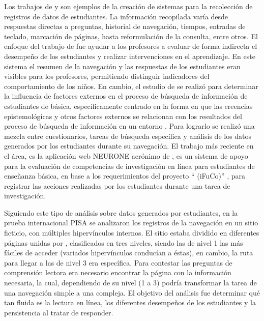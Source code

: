 Los trabajos de \textcite{hwang2008novel} y \textcite{tu2008eighth} son ejemplos de la creación de sistemas para la recolección de registros de datos de estudiantes. La información recopilada varía desde respuestas directas a preguntas, historial de navegación, tiempos, entradas de teclado, marcación de páginas, hasta reformulación de la consulta, entre otros. El enfoque del trabajo de \textcite{hwang2008novel} fue ayudar a los profesores a evaluar de forma indirecta el desempeño de los estudiantes y realizar intervenciones en el aprendizaje. En este sistema el resumen de la navegación y las respuestas de los estudiantes eran visibles para los profesores, permitiendo distinguir indicadores del comportamiento  de los niños. En cambio, el estudio de \textcite{tu2008eighth} se realizó para determinar la influencia de factores externos en el proceso de búsqueda de información de estudiantes de básica, específicamente centrado en la forma en que las creencias epistemológicas y otros factores externos se relacionan con los resultados del proceso de búsqueda de información en un entorno . Para lograrlo se realizó una mezcla entre cuestionarios, tareas de búsqueda específica y análisis de los datos generados por los estudiantes durante su navegación. El trabajo más reciente en el área, es la aplicación web NEURONE \parencite{gonzalez2017neurone} acrónimo de , es un sistema de apoyo para la evaluación de competencias de investigación en línea para estudiantes de enseñanza básica, en base a los requerimientos del proyecto “ (iFuCo)” \parencite{sormen2017performance}, para registrar las acciones realizadas por los estudiantes durante una tarea de investigación. 

Siguiendo este tipo de análisis sobre datos generados por estudiantes, en la prueba internacional PISA \parencite{PISA} se analizaron los registros de la navegación en un sitio  ficticio, con múltiples hipervínculos internos. El sitio estaba dividido en diferentes páginas unidas por , clasificados en tres niveles, siendo las de nivel 1 las más fáciles de acceder (variados hipervínculos conducían a éstas), en cambio, la ruta para llegar a las de nivel 3 era específica. Para contestar las preguntas de comprensión lectora era necesario encontrar la página con la información necesaria, la cual, dependiendo de su nivel (1 a 3) podría transformar la tarea de una navegación simple a una compleja. El objetivo del análisis fue determinar qué tan fluida es la lectura en línea, los diferentes desempeños de los estudiantes y la persistencia al tratar de responder.


